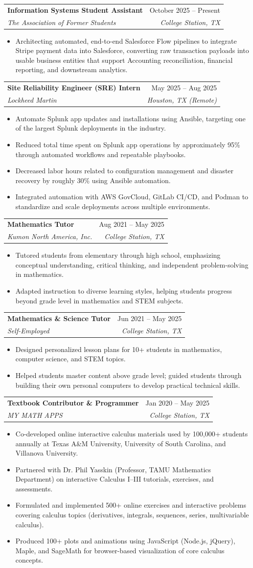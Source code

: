 \documentclass[letterpaper,11pt]{article}
\makeatletter
\newcommand{\resumeItem}[1]{
  \item\small{
    {#1 \vspace{-2pt}}
  }
}
\newcommand{\resumeSubheading}[4]{
  \vspace{-2pt}\item
    \begin{tabular*}{0.97\textwidth}[t]{l@{\extracolsep{\fill}}r}
      \textbf{#1} & #2 \\
      \textit{\small#3} & \textit{\small #4} \\
    \end{tabular*}\vspace{-7pt}
}
\newcommand{\resumeItemListStart}{\begin{itemize}}
\newcommand{\resumeItemListEnd}{\end{itemize}\vspace{-5pt}}
\makeatother
\begin{document}
    \resumeSubheading
      {Information Systems Student Assistant}{October 2025 -- Present}
      {The Association of Former Students}{College Station, TX}
      \resumeItemListStart
        \resumeItem{Architecting automated, end-to-end Salesforce Flow pipelines to integrate Stripe payment data into Salesforce, converting raw transaction payloads into usable business entities that support Accounting reconciliation, financial reporting, and downstream analytics.}
      \resumeItemListEnd

    \resumeSubheading
      {Site Reliability Engineer (SRE) Intern}{May 2025 -- Aug 2025}
      {Lockheed Martin}{Houston, TX (Remote)}
      \resumeItemListStart
        \resumeItem{Automate Splunk app updates and installations using Ansible, targeting one of the largest Splunk deployments in the industry.}
        \resumeItem{Reduced total time spent on Splunk app operations by approximately 95\% through automated workflows and repeatable playbooks.}
        \resumeItem{Decreased labor hours related to configuration management and disaster recovery by roughly 30\% using Ansible automation.}
        \resumeItem{Integrated automation with AWS GovCloud, GitLab CI/CD, and Podman to standardize and scale deployments across multiple environments.}
      \resumeItemListEnd

    \resumeSubheading
      {Mathematics Tutor}{Aug 2021 -- May 2025}
      {Kumon North America, Inc.}{College Station, TX}
      \resumeItemListStart
        \resumeItem{Tutored students from elementary through high school, emphasizing conceptual understanding, critical thinking, and independent problem-solving in mathematics.}
        \resumeItem{Adapted instruction to diverse learning styles, helping students progress beyond grade level in mathematics and STEM subjects.}
      \resumeItemListEnd

    \resumeSubheading
      {Mathematics \& Science Tutor}{Jun 2021 -- May 2025}
      {Self-Employed}{College Station, TX}
      \resumeItemListStart
        \resumeItem{Designed personalized lesson plans for 10+ students in mathematics, computer science, and STEM topics.}
        \resumeItem{Helped students master content above grade level; guided students through building their own personal computers to develop practical technical skills.}
      \resumeItemListEnd

    \resumeSubheading
      {Textbook Contributor \& Programmer}{Jan 2020 -- May 2025}
      {MY MATH APPS}{College Station, TX}
      \resumeItemListStart
        \resumeItem{Co-developed online interactive calculus materials used by 100,000+ students annually at Texas A\&M University, University of South Carolina, and Villanova University.}
        \resumeItem{Partnered with Dr. Phil Yasskin (Professor, TAMU Mathematics Department) on interactive Calculus I–III tutorials, exercises, and assessments.}
        \resumeItem{Formulated and implemented 500+ online exercises and interactive problems covering calculus topics (derivatives, integrals, sequences, series, multivariable calculus).}
        \resumeItem{Produced 100+ plots and animations using JavaScript (Node.js, jQuery), Maple, and SageMath for browser-based visualization of core calculus concepts.}
      \resumeItemListEnd
\end{document}
